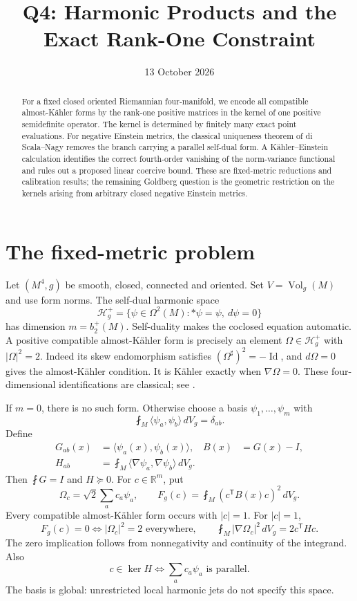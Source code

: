\documentclass[11pt]{article}
\title{Q4: Harmonic Products and the Exact Rank-One Constraint}
\author{}
\date{13 October 2026}
\theoremstyle{remark}\newtheorem{remark}[proposition]{Remark}
\newcommand{\Vol}{\operatorname{Vol}}
\newcommand{\Id}{\operatorname{Id}}
\newcommand{\av}{\mathop{\fint}\nolimits}
\newcommand{\HH}{\mathcal H_g^+}
\begin{document}
\maketitle
\begin{abstract}
For a fixed closed oriented Riemannian four-manifold, we encode all compatible almost-K\"ahler forms by the rank-one positive matrices in the kernel of one positive semidefinite operator. The kernel is determined by finitely many exact point evaluations. For negative Einstein metrics, the classical uniqueness theorem of di Scala--Nagy removes the branch carrying a parallel self-dual form. A K\"ahler--Einstein calculation identifies the correct fourth-order vanishing of the norm-variance functional and rules out a proposed linear coercive bound. These are fixed-metric reductions and calibration results; the remaining Goldberg question is the geometric restriction on the kernels arising from arbitrary closed negative Einstein metrics.
\end{abstract}

\section{The fixed-metric problem}
Let $(M^4,g)$ be smooth, closed, connected and oriented. Set $V=\Vol_g(M)$ and use form norms. The self-dual harmonic space
\[
 \HH=\{\psi\in\Omega^2(M):*\psi=\psi,\ d\psi=0\}
\]
has dimension $m=b_2^+(M)$. Self-duality makes the coclosed equation automatic. A positive compatible almost-K\"ahler form is precisely an element $\Omega\in\HH$ with $|\Omega|^2=2$. Indeed its skew endomorphism satisfies $(\Omega^\sharp)^2=-\Id$, and $d\Omega=0$ gives the almost-K\"ahler condition. It is K\"ahler exactly when $\nabla\Omega=0$. These four-dimensional identifications are classical; see \cite{AAD}.

If $m=0$, there is no such form. Otherwise choose a basis $\psi_1,\ldots,\psi_m$ with
\[
 \av_M\langle\psi_a,\psi_b\rangle\,dV_g=\delta_{ab}.
\]
Define
\begin{align*}
 G_{ab}(x)&=\langle\psi_a(x),\psi_b(x)\rangle, & B(x)&=G(x)-I,\\
 H_{ab}&=\av_M\langle\nabla\psi_a,\nabla\psi_b\rangle\,dV_g.
\end{align*}
Then $\av G=I$ and $H\succeq0$. For $c\in\mathbb R^m$, put
\[
 \Omega_c=\sqrt2\sum_a c_a\psi_a,\qquad
 F_g(c)=\av_M(c^{\mathsf T}B(x)c)^2\,dV_g.
\]
Every compatible almost-K\"ahler form occurs with $|c|=1$. For $|c|=1$,
\begin{equation}
 F_g(c)=0\iff |\Omega_c|^2=2\text{ everywhere},\qquad
 \av_M|\nabla\Omega_c|^2\,dV_g=2c^{\mathsf T}Hc.
 \label{eq:original}
\end{equation}
The zero implication follows from nonnegativity and continuity of the integrand. Also
\[
 c\in\ker H\iff \sum_a c_a\psi_a\text{ is parallel}.
\]
The basis is global: unrestricted local harmonic jets do not specify this space.
\end{document}
